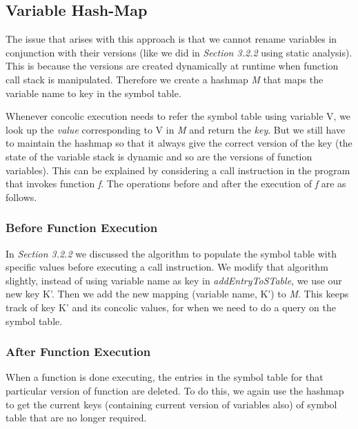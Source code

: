 \documentclass[12pt,oneside]{book}
\begin{document}
\subsection{Variable Hash-Map}
The issue that arises with this approach is that we cannot rename variables in conjunction with their versions (like we did in \textit{Section 3.2.2} using static analysis). This is because the versions are created dynamically at runtime when function call stack is manipulated. Therefore we create a hashmap \textit{M} that maps the variable name to key in the symbol table.  

Whenever concolic execution needs to refer the symbol table using variable V, we look up the \textit{value} corresponding to V in \textit{M} and return the \textit{key}. But we still have to maintain the hashmap so that it always give the correct version of the key (the state of the variable stack is dynamic and so are the versions of function variables). This can be explained by considering a call instruction in the program that invokes function \textit{f}. The operations before and after the execution of \textit{f} are as follows.

\subsubsection{Before Function Execution}
In \textit{Section 3.2.2} we discussed the algorithm to populate the symbol table with specific values before executing a call instruction. We modify that algorithm slightly, instead of using variable name as key in \textit{addEntryToSTable}, we use our new key K'. Then we add the new mapping (variable name, K') to \textit{M}. This keeps track of key K' and its concolic values, for when we need to do a query on the symbol table.


\subsubsection{After Function Execution}
When a function is done executing, the entries in the symbol table for that particular version of function are deleted. To do this, we again use the hashmap to get the current keys (containing current version of variables also) of symbol table that are no longer required.
\end{document}
